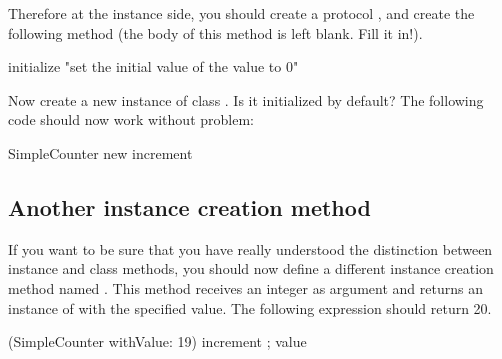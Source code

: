 Therefore at the instance side, you should create a protocol
, and create the following method (the body
of this method is left blank. Fill it in!).

\begin{scode}
initialize
   "set the initial value of the value to 0"
\end{scode}


Now create a new instance of class . Is it
initialized by default? The following code should now work without
problem:

\begin{scode}
SimpleCounter new increment
\end{scode}

\subsection{Another instance creation method}
If you want to be sure that you have really understood the
distinction between instance and class methods, you should now define
a different instance creation method named .
This method receives an integer as argument and returns an
instance of  with the specified value. The
following expression should return 20.

\begin{scode}(SimpleCounter withValue: 19) increment ; value
\end{scode}

